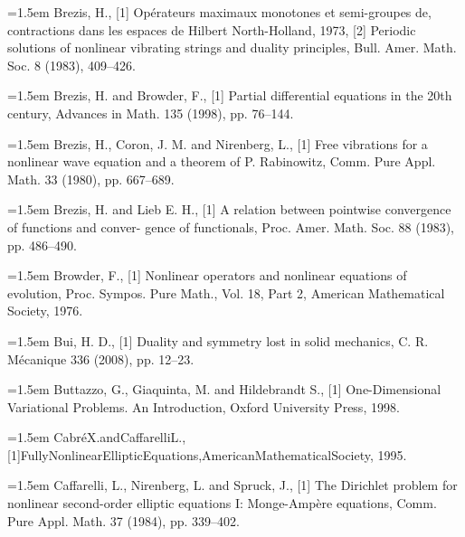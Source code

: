\noindent\hangindent=1.5em Brezis, H., \hypertarget{ref:Brezis-1}{[1]} Opérateurs maximaux monotones et semi-groupes de, contractions dans les espaces de Hilbert North-Holland, 1973, \hypertarget{ref:Brezis-2}{[2]} Periodic solutions of nonlinear vibrating strings and duality principles, Bull. Amer. Math. Soc. 8 (1983), 409--426.\par{}
\noindent\hangindent=1.5em Brezis, H. and Browder, F., \hypertarget{ref:Browder-1}{[1]} Partial differential equations in the 20th century, Advances in Math. 135 (1998), pp. 76--144.\par{}
\noindent\hangindent=1.5em Brezis, H., Coron, J. M. and Nirenberg, L., \hypertarget{ref:BrezisCoronNirenberg-1}{[1]} Free vibrations for a nonlinear wave equation and a theorem of P. Rabinowitz, Comm. Pure Appl. Math. 33 (1980), pp. 667--689.\par{}
\noindent\hangindent=1.5em Brezis, H. and Lieb E. H., \hypertarget{ref:Brezis-1}{[1]} A relation between pointwise convergence of functions and conver- gence of functionals, Proc. Amer. Math. Soc. 88 (1983), pp. 486--490.\par{}
\noindent\hangindent=1.5em Browder, F., \hypertarget{ref:Browder-1}{[1]} Nonlinear operators and nonlinear equations of evolution, Proc. Sympos. Pure Math., Vol. 18, Part 2, American Mathematical Society, 1976.\par{}
\noindent\hangindent=1.5em Bui, H. D., \hypertarget{ref:Bui-1}{[1]} Duality and symmetry lost in solid mechanics, C. R. Mécanique 336 (2008), pp. 12--23.\par{}
\noindent\hangindent=1.5em Buttazzo, G., Giaquinta, M. and Hildebrandt S., \hypertarget{ref:ButtazzoGiaquintaHildebrandt-1}{[1]} One-Dimensional Variational Problems. An Introduction, Oxford University Press, 1998.\par{}
\noindent\hangindent=1.5em CabréX.andCaffarelliL.,\hypertarget{ref:CabreCaffarelli-1}{[1]}FullyNonlinearEllipticEquations,AmericanMathematicalSociety, 1995.\par{}
\noindent\hangindent=1.5em Caffarelli, L., Nirenberg, L. and Spruck, J., \hypertarget{ref:CaffarelliNirenbergSpruck-1}{[1]} The Dirichlet problem for nonlinear second-order elliptic equations I: Monge-Ampère equations, Comm. Pure Appl. Math. 37 (1984), pp. 339--402.\par{}

